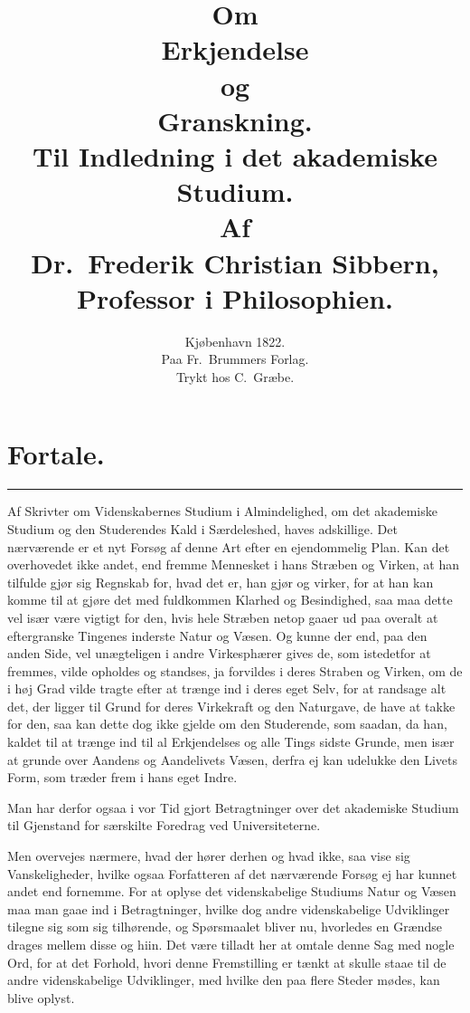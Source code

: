 \documentclass[12pt,a4paper]{book}
\title{\textbf{Om}\\[6pt]
  \Huge\textbf{Erkjendelse}\\[6pt]
  \large og\\[6pt]
  \Large\textbf{Granskning.}\\[12pt]
  \normalsize Til Indledning i det akademiske Studium.\\[16pt]
  \normalsize Af\\[6pt]
  \large Dr.\ Frederik Christian Sibbern,\\[4pt]
  \normalsize Professor i Philosophien.}
\author{}
\date{Kjøbenhavn 1822.\\
  Paa Fr.\ Brummers Forlag.\\
  Trykt hos C.\ Græbe.}
\newcommand{\opage}[1]{\marginnote{\footnotesize\textit{[#1]}}}
\begin{document}
\maketitle
\thispagestyle{empty}
\cleardoublepage

\chapter*{Fortale.}

\begin{center}\rule{0.28\linewidth}{0.4pt}\end{center}

\opage{III} Af Skrivter om Videnskabernes Studium i Almindelighed, om det akademiske
Studium og den Studerendes Kald i Særdeleshed, haves adskillige. Det
nærværende er et nyt Forsøg af denne Art efter en ejendommelig Plan. Kan
det overhovedet ikke andet, end fremme Mennesket i hans Stræben og Virken,
at han tilfulde gjør sig Regnskab for, hvad det er, han gjør og virker, for
at han kan komme til at gjøre det med fuldkommen Klarhed og Besindighed, saa
maa dette vel især være vigtigt for den, hvis hele Stræben netop gaaer ud
paa overalt at eftergranske Tingenes inderste Natur og Væsen. Og kunne der
end, paa den anden Side, vel unægteligen i andre Virkesphærer gives de, som
istedetfor at fremmes, vilde opholdes og standses, ja \opage{IV} forvildes i deres
Straben og Virken, om de i høj Grad vilde tragte efter at trænge ind i deres
eget Selv, for at randsage alt det, der ligger til Grund for deres Virkekraft
og den Naturgave, de have at takke for den, saa kan dette dog ikke gjelde om
den Studerende, som saadan, da han, kaldet til at trænge ind til al
Erkjendelses og alle Tings sidste Grunde, men især at grunde over Aandens og
Aandelivets Væsen, derfra ej kan udelukke den Livets Form, som træder frem i
hans eget Indre.

Man har derfor ogsaa i vor Tid gjort Betragtninger over det akademiske
Studium til Gjenstand for særskilte Foredrag ved Universiteterne.

Men overvejes nærmere, hvad der hører derhen og hvad ikke, saa vise sig
Vanskeligheder, hvilke ogsaa Forfatteren af det nærværende Forsøg ej har
kunnet andet end fornemme. For at oplyse det videnskabelige Studiums Natur og
Væsen maa man gaae ind i Betragtninger, hvilke dog andre videnskabelige
Udviklinger tilegne sig som sig tilhørende, og Spørsmaalet bliver nu,
hvorledes en Grændse drages mellem disse og hiin. Det være tilladt her at
\opage{V} omtale denne Sag med nogle Ord, for at det Forhold, hvori denne Fremstilling
er tænkt at skulle staae til de andre videnskabelige Udviklinger, med hvilke
den paa flere Steder mødes, kan blive oplyst.
\end{document}
